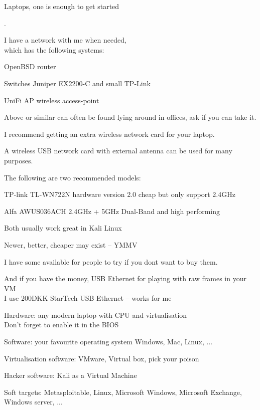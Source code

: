 \documentclass[Screen16to9,17pt]{foils}
\begin{document}

Laptops, one is enough to get started

.

\begin{list1}
\item I have a network with me when needed, \\
which has the following systems:
\begin{list2}
\item OpenBSD router
\item Switches Juniper EX2200-C and small TP-Link
\item UniFi AP wireless access-point
\end{list2}
\end{list1}

Above or similar can often be found lying around in offices, ask if you can take it.



I recommend getting an extra wireless network card for your laptop.

A wireless USB network card with external antenna can be used for many purposes.

\begin{list2}
\item The following are two recommended models:
\item TP-link TL-WN722N hardware version 2.0 cheap but only support 2.4GHz
\item Alfa AWUS036ACH 2.4GHz + 5GHz Dual-Band and high performing
\item Both usually work great in Kali Linux
\item Newer, better, cheaper may exist -- YMMV
\end{list2}

I have some available for people to try if you dont want to buy them.

And if you have the money, USB Ethernet for playing with raw frames in your VM\\
I use 200DKK StarTech USB Ethernet -- works for me




\begin{list2}
\item Hardware: any modern laptop with CPU and virtualisation\\
Don't forget to enable it in the BIOS
\item Software: your favourite operating system Windows, Mac, Linux, ...
\item Virtualisation software: VMware, Virtual box, pick your poison
\item Hacker software: Kali as a Virtual Machine 
\item Soft targets: Metasploitable, Linux, Microsoft Windows, Microsoft Exchange, Windows server, ...
\end{list2}




\myquestionspage
\end{document}
